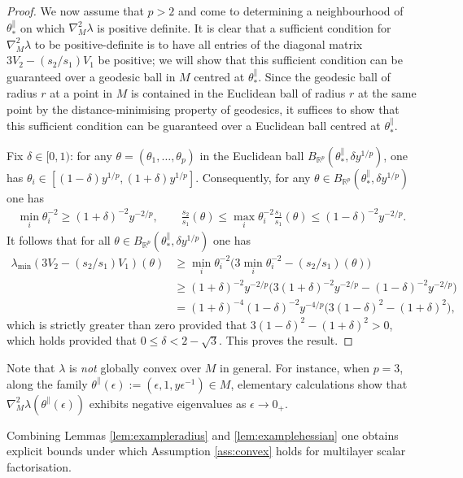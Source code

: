 \documentclass{article}
\newcommand{\RB}{\mathbb{R}}
\newcommand{\tpa}{\theta^{\parallel}}
\theoremstyle{plain}
\theoremstyle{definition}
\theoremstyle{remark}
\begin{document}
\begin{proof}
     We now assume that $p>2$ and come to determining a neighbourhood of $\tpa_*$ on which $\nabla^2_M\lambda$ is positive definite. It is clear that a sufficient condition for $\nabla^2_M\lambda$ to be positive-definite is to have all entries of the diagonal matrix $3V_2-(s_2/s_1)V_1$ be positive; we will show that this sufficient condition can be guaranteed over a geodesic ball in $M$ centred at $\tpa_*$. Since the geodesic ball of radius $r$ at a point in $M$ is contained in the Euclidean ball of radius $r$ at the same point by the distance-minimising property of geodesics, it suffices to show that this sufficient condition can be guaranteed over a Euclidean ball centred at $\tpa_*$.
     
     Fix $\delta\in[0,1)$: for any $\theta = (\theta_1,\dots,\theta_p)$ in the Euclidean ball $B_{\RB^p}(\tpa_*,\delta y^{1/p})$, one has $\theta_i\in[(1-\delta)y^{1/p},(1+\delta)y^{1/p}]$. Consequently, for any $\theta\in B_{\RB^p}(\tpa_*,\delta y^{1/p})$ one has
     \begin{align}
         \min_i\theta_i^{-2}\geq (1+\delta)^{-2}y^{-2/p},\qquad \frac{s_2}{s_1}(\theta)\leq \max_i\theta_i^{-2}\frac{s_1}{s_1}(\theta)\leq (1-\delta)^{-2}y^{-2/p}.
     \end{align}
     It follows that for all $\theta\in B_{\RB^p}(\tpa_*,\delta y^{1/p})$ one has
     \begin{align}
         \lambda_{\min}(3V_2-(s_2/s_1)V_1)(\theta)&\geq \min_i\theta_i^{-2}\big(3\min_i\theta_i^{-2} - (s_2/s_1)(\theta)\big)\\&\geq (1+\delta)^{-2}y^{-2/p}\big(3(1+\delta)^{-2}y^{-2/p}-(1-\delta)^{-2}y^{-2/p}\big)\\&=(1+\delta)^{-4}(1-\delta)^{-2}y^{-4/p}\big(3(1-\delta)^2-(1+\delta)^2\big),
     \end{align}
     which is strictly greater than zero provided that $3(1-\delta)^2-(1+\delta)^2>0$, which holds provided that $0\leq \delta< 2-\sqrt{3}$. This proves the result.
\end{proof}

Note that $\lambda$ is \emph{not} globally convex over $M$ in general. For instance, when $p=3$, along the family $\tpa(\epsilon):=(\epsilon,1,y\epsilon^{-1})\in M$, elementary calculations show that $\nabla^2_M\lambda(\tpa(\epsilon))$ exhibits negative eigenvalues as $\epsilon\rightarrow 0_+$.

Combining Lemmas \ref{lem:exampleradius} and \ref{lem:examplehessian} one obtains explicit bounds under which Assumption \ref{ass:convex} holds for multilayer scalar factorisation.
\end{document}
